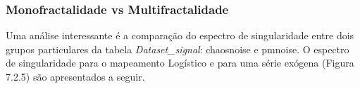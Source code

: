 \begin{figure}[ht!]
	\vspace{0mm}	%
	\begin{center}
	\end{center}
	\vspace{-2mm}	%
	\label{ex6_fig1}
\end{figure}


\subsubsection*{Monofractalidade vs Multifractalidade}

Uma análise interessante é a comparação do espectro de singularidade entre dois grupos particulares da tabela \textit{Dataset\_signal}: chaosnoise e pmnoise. O espectro de singularidade para o mapeamento Logístico e para uma série exógena (Figura 7.2.5) são apresentados a seguir.

